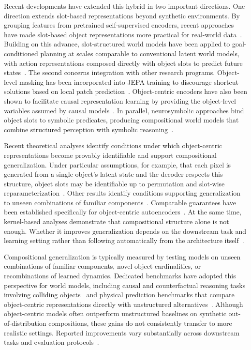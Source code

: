 \documentclass[acmsmall,screen,review,anonymous]{acmart}
\begin{document}
Recent developments have extended this hybrid in two important directions.
%
One direction extends slot-based representations beyond synthetic environments.
%
By grouping features from pretrained self-supervised encoders, recent approaches have made slot-based object representations more practical for real-world data~\citep{seitzer2023bridging}.
%
Building on this advance, slot-structured world models have been applied to goal-conditioned planning at scales comparable to conventional latent world models, with action representations composed directly with object slots to predict future states~\citep{feng2026learning}.
%
The second concerns integration with other research programs.
%
Object-level masking has been incorporated into JEPA training to discourage shortcut solutions based on local patch prediction~\citep{nam2026causaljepa}.
%
Object-centric encoders have also been shown to facilitate causal representation learning by providing the object-level variables assumed by causal models~\citep{mansouri2024object}.
%
In parallel, neurosymbolic approaches bind object slots to symbolic predicates, producing compositional world models that combine structured perception with symbolic reasoning~\citep{sehgal2024neurosymbolic}.

Recent theoretical analyses identify conditions under which object-centric representations become provably identifiable and support compositional generalization.
%
Under particular assumptions, for example, that each pixel is generated from a single object's latent state and the decoder respects this structure, object slots may be identifiable up to permutation and slot-wise reparameterization~\citep{brady2023object}.
%
Other results identify conditions supporting generalization to unseen combinations of familiar components~\citep{wiedemer2023compositional}.
%
Comparable guarantees have been established specifically for object-centric autoencoders~\citep{wiedemer2024provable}.
%
At the same time, kernel-based analyses demonstrate that compositional structure alone is not enough.
%
Whether it improves generalization depends on the downstream task and learning setting rather than following automatically from the architecture itself~\citep{lippl2025when}.

Compositional generalization is typically measured by testing models on unseen combinations of familiar components, novel object cardinalities, or recombinations of learned dynamics.
%
Dedicated benchmarks have adopted this perspective for world models, including causal and counterfactual reasoning tasks involving colliding objects~\citep{CLEVRER2020ICLR} and physical prediction benchmarks that compare object-centric representations directly with unstructured alternatives~\citep{bear2022physionevaluatingphysicalprediction,tung2023physion}. 
%
Although object-centric models often outperform unstructured baselines on synthetic out-of-distribution compositions, these gains do not consistently transfer to more realistic settings.
%
Reported improvements vary substantially across downstream tasks and evaluation protocols~\citep{dittadi2022generalizationrobustnessimplicationsobjectcentric}.
\end{document}
